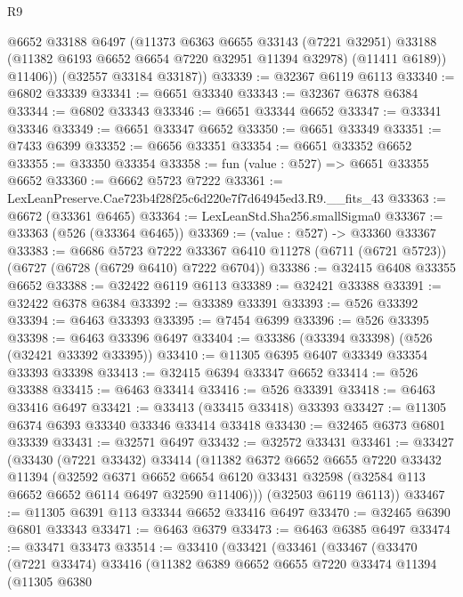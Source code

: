 \begin{lexlean}{R9}
\begin{coremodule}
          @6652
          @33188
          @6497
          (@11373
            @6363
            @6655
            @33143
            (@7221 @32951)
            @33188
            (@11382 @6193 @6652 @6654 @7220 @32951 @11394 @32978)
            (@11411 @6189))
          @11406))
      (@32557 @33184 @33187))
@33339 := @32367 @6119 @6113
@33340 := @6802 @33339
@33341 := @6651 @33340
@33343 := @32367 @6378 @6384
@33344 := @6802 @33343
@33346 := @6651 @33344 @6652
@33347 := @33341 @33346
@33349 := @6651 @33347 @6652
@33350 := @6651 @33349
@33351 := @7433 @6399
@33352 := @6656 @33351
@33354 := @6651 @33352 @6652
@33355 := @33350 @33354
@33358 := fun (value : @527) => @6651 @33355 @6652
@33360 := @6662 @5723 @7222
@33361 := LexLeanPreserve.Cae723b4f28f25c6d220e7f7d64945ed3.R9.__fits_43
@33363 := @6672 (@33361 @6465)
@33364 := LexLeanStd.Sha256.smallSigma0
@33367 := @33363 (@526 (@33364 @6465))
@33369 := (value : @527) -> @33360 @33367
@33383 := @6686
    @5723
    @7222
    @33367
    @6410
    @11278
    (@6711 (@6721 @5723))
    (@6727 (@6728 (@6729 @6410) @7222 @6704))
@33386 := @32415 @6408 @33355 @6652
@33388 := @32422 @6119 @6113
@33389 := @32421 @33388
@33391 := @32422 @6378 @6384
@33392 := @33389 @33391
@33393 := @526 @33392
@33394 := @6463 @33393
@33395 := @7454 @6399
@33396 := @526 @33395
@33398 := @6463 @33396 @6497
@33404 := @33386 (@33394 @33398) (@526 (@32421 @33392 @33395))
@33410 := @11305 @6395 @6407 @33349 @33354 @33393 @33398
@33413 := @32415 @6394 @33347 @6652
@33414 := @526 @33388
@33415 := @6463 @33414
@33416 := @526 @33391
@33418 := @6463 @33416 @6497
@33421 := @33413 (@33415 @33418) @33393
@33427 := @11305 @6374 @6393 @33340 @33346 @33414 @33418
@33430 := @32465 @6373 @6801 @33339
@33431 := @32571 @6497
@33432 := @32572 @33431
@33461 := @33427
    (@33430
      (@7221 @33432)
      @33414
      (@11382
        @6372
        @6652
        @6655
        @7220
        @33432
        @11394
        (@32592
          @6371
          @6652
          @6654
          @6120
          @33431
          @32598
          (@32584 @113 @6652 @6652 @6114 @6497 @32590 @11406)))
      (@32503 @6119 @6113))
@33467 := @11305 @6391 @113 @33344 @6652 @33416 @6497
@33470 := @32465 @6390 @6801 @33343
@33471 := @6463 @6379
@33473 := @6463 @6385 @6497
@33474 := @33471 @33473
@33514 := @33410
    (@33421
      (@33461
        (@33467
          (@33470
            (@7221 @33474)
            @33416
            (@11382
              @6389
              @6652
              @6655
              @7220
              @33474
              @11394
              (@11305
                @6380

\end{coremodule}
\end{lexlean}
